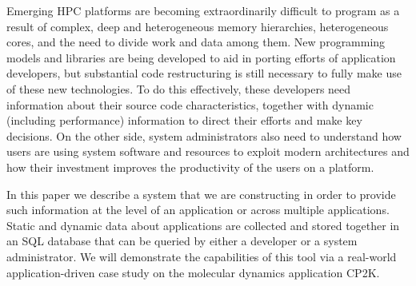 Emerging HPC platforms are becoming extraordinarily difficult to program as a result of complex, deep and heterogeneous memory hierarchies, heterogeneous cores, and the need to divide work and data among them.
New programming models and libraries are being developed to aid in porting efforts of application developers, but substantial code restructuring is still necessary to fully make use of these new technologies.
To do this effectively, these developers need information about their source code characteristics, together with dynamic (including performance) information to direct their efforts and make key decisions.
On the other side, system administrators also need to understand how users are using system software and resources to exploit modern architectures and how their investment improves the productivity of the users on a platform.

In this paper we describe a system that we are constructing in order to provide such information at the level of an application or across multiple applications.
Static and dynamic data about applications are collected and stored together in an \acs{SQL} database that can be queried by either a developer or a system administrator.
We will demonstrate the capabilities of this tool via a real-world application-driven case study on the molecular dynamics application CP2K.

